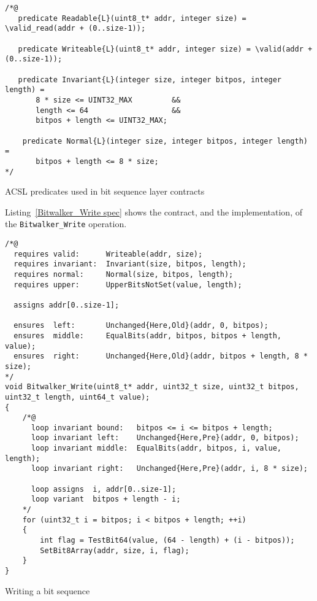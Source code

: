 \begin{listing}[hbt]
\begin{minipage}{0.99\textwidth}
\begin{lstlisting}[style=acsl-block]
/*@
   predicate Readable{L}(uint8_t* addr, integer size) = \valid_read(addr + (0..size-1));

   predicate Writeable{L}(uint8_t* addr, integer size) = \valid(addr + (0..size-1));

   predicate Invariant{L}(integer size, integer bitpos, integer length) =
       8 * size <= UINT32_MAX         &&
       length <= 64                   &&
       bitpos + length <= UINT32_MAX;

    predicate Normal{L}(integer size, integer bitpos, integer length) =
       bitpos + length <= 8 * size;
*/
\end{lstlisting}
\end{minipage}
\caption{\label{lst:Bitsequence preds} ACSL predicates used in bit sequence layer contracts}
\end{listing}


\FloatBarrier


Listing~\ref{Bitwalker_Write spec} shows the contract, and the
implementation, of the
\lstinline{Bitwalker_Write} operation.

\begin{listing}[hbt]
\begin{minipage}{0.99\textwidth}
\begin{lstlisting}[style=acsl-block]
/*@
  requires valid:      Writeable(addr, size);
  requires invariant:  Invariant(size, bitpos, length);
  requires normal:     Normal(size, bitpos, length);
  requires upper:      UpperBitsNotSet(value, length);

  assigns addr[0..size-1];

  ensures  left:       Unchanged{Here,Old}(addr, 0, bitpos);
  ensures  middle:     EqualBits(addr, bitpos, bitpos + length, value);
  ensures  right:      Unchanged{Here,Old}(addr, bitpos + length, 8 * size);
*/
void Bitwalker_Write(uint8_t* addr, uint32_t size, uint32_t bitpos, uint32_t length, uint64_t value);
{
    /*@
      loop invariant bound:   bitpos <= i <= bitpos + length;
      loop invariant left:    Unchanged{Here,Pre}(addr, 0, bitpos);
      loop invariant middle:  EqualBits(addr, bitpos, i, value, length);
      loop invariant right:   Unchanged{Here,Pre}(addr, i, 8 * size);

      loop assigns  i, addr[0..size-1];
      loop variant  bitpos + length - i;
    */
    for (uint32_t i = bitpos; i < bitpos + length; ++i)
    {
        int flag = TestBit64(value, (64 - length) + (i - bitpos));
        SetBit8Array(addr, size, i, flag);
    }   
}

\end{lstlisting}
\end{minipage}
\caption{\label{Bitwalker_Write spec}Writing a bit sequence}
\end{listing}

